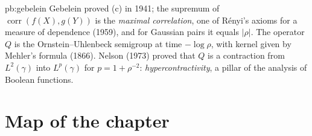 \begin{solution}{pb:gebelein}
\leads Gebelein proved (c) in 1941; the supremum of $\operatorname{corr}(f(X),g(Y))$ is the \emph{maximal correlation}, one of Rényi's axioms for a measure of dependence (1959), and
for Gaussian pairs it equals $|\rho|$. The operator $Q$ is the Ornstein--Uhlenbeck semigroup at time $-\log\rho$, with kernel given by Mehler's formula (1866). Nelson (1973) proved that $Q$ is
a contraction from $L^2(\gamma)$ into $L^p(\gamma)$ for $p=1+\rho^{-2}$: \emph{hypercontractivity}, a pillar of the analysis of Boolean functions.
\end{solution}

\section*{Map of the chapter}

